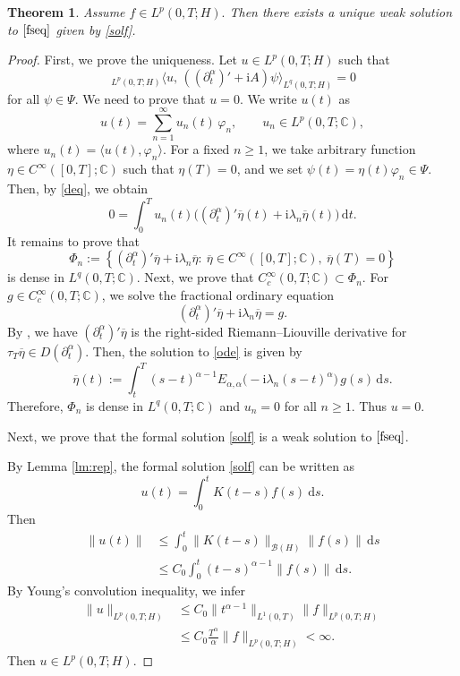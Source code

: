 \documentclass[reqno]{amsart}
\newtheorem{theorem}{Theorem}[section]
\numberwithin{equation}{section}
\def \d {\mathrm{d}}
\begin{document}
\begin{theorem}
Assume $f\in L^p(0,T;H).$ Then there exists a unique weak solution to $\eqref{fseq}$ given by \eqref{solf}.
\end{theorem}
\begin{proof}
First, we prove the uniqueness. Let $u\in L^p(0,T;H)$ such that
\begin{equation} \label{deq}
 \, _{L^p(0,T;H)}\langle u, \, ((\partial_t^\alpha)' +\mathrm{i} A)\psi \rangle_{L^{q}(0,T;H)} 
=0
\end{equation}
for all $\psi \in \Psi$. We need to prove that $u=0$. We write $u(t)$ as
$$u(t)=\sum_{n=1}^\infty u_n(t)\,\varphi_n,\qquad u_n\in L^p(0,T;\mathbb{C}),$$
where $u_n(t)=\langle u(t),\varphi_n\rangle$. For a fixed $n\ge 1$, we take arbitrary function $\eta\in C^\infty([0,T];\mathbb{C})$ such that $\eta(T)=0$, and we set $\psi(t)=\eta(t)\varphi_n\in\Psi$. Then, by \eqref{deq}, we obtain
$$ 0=\int_0^T u_n(t)\big((\partial_t^\alpha)'\overline{\eta}(t)+\mathrm{i}\lambda_n\overline{\eta}(t)\big)\,\d t.$$
It remains to prove that
$$\Phi_n:=\left\{(\partial_t^\alpha)'\overline{\eta} +\mathrm{i}\lambda_n\overline{\eta}:\ \overline{\eta}\in C^\infty([0,T];\mathbb{C}),\ \overline{\eta}(T)=0\right\}$$
is dense in $L^q(0,T;\mathbb{C})$. Next, we prove that $C_c^\infty(0,T;\mathbb{C}) \subset \Phi_n$. For $g\in C_c^\infty(0,T;\mathbb{C})$, we solve the fractional ordinary equation
\begin{equation}\label{ode}
(\partial_t^\alpha)'\overline{\eta} +\mathrm{i}\lambda_n\overline{\eta} = g.
\end{equation}
By \cite[Lemma 3.1]{Ya18}, we have $(\partial_t^\alpha)'\overline{\eta}$ is the right-sided Riemann–Liouville derivative for $\tau_T \overline{\eta} \in D(\partial_t^\alpha)$. Then, the solution to \eqref{ode} is given by
$$\overline{\eta}(t):=\int_t^T (s-t)^{\alpha-1}E_{\alpha,\alpha}\big(-\mathrm{i}\lambda_n (s-t)^\alpha\big)\,g(s)\,\d s.$$
Therefore, $\Phi_n$ is dense in $L^q(0,T;\mathbb{C})$ and $u_n=0$ for all $n\ge 1$. Thus $u=0$.

Next, we prove that the formal solution \eqref{solf} is a weak solution to $\eqref{fseq}$.

By Lemma \ref{lm:rep}, the formal solution \eqref{solf} can be written as
$$u(t)=\int_{0}^{t}K(t-s)f(s)~\d s.$$
Then
\begin{align*}
\|u(t)\| &\le  \int_0^t \|K(t-s)\|_{\mathcal{B}(H)}\|f(s)\|\,\d s\\
&\le C_0 \int_0^t (t-s)^{\alpha-1}\|f(s)\|\,\d s.
\end{align*}
By Young's convolution inequality, we infer
\begin{align*}
\|u\|_{L^p(0,T;H)} &\le C_0 \|t^{\alpha-1}\|_{L^1(0,T)} \|f\|_{L^p(0,T;H)}\\
& \le C_0 \frac{T^\alpha}{\alpha} \|f\|_{L^p(0,T;H)} <\infty.
\end{align*}
Then $u\in L^p(0,T;H)$.


\end{proof}
\end{document}

